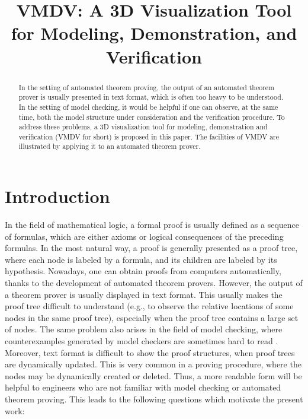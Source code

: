 \documentclass[runningheads]{llncs}
\newcommand\tool[1]{\textsf{#1}}
\newcommand\vmdv{\tool{VMDV}}
\newcommand\couic[1]{}
\begin{document}
	
\title{\vmdv: A 3D Visualization Tool for Modeling, Demonstration, and Verification}

\couic{\author{
       \IEEEauthorblockN{Jian Liu\IEEEauthorrefmark{1}\IEEEauthorrefmark{2},
       Ying Jiang\IEEEauthorrefmark{1} and
       Yanyun Chen\IEEEauthorrefmark{1}}
}}

\author{}


\maketitle

\begin{abstract}
In the setting of automated theorem proving,
the output of an automated theorem prover is usually presented in text format,
which is often too heavy to be understood. 
In the setting of model checking, 
it would be helpful if one can observe, at the same time, 
both the model structure under consideration and the verification procedure. 
To address these problems, 
a 3D visualization tool for modeling, demonstration and verification (\vmdv{} for short) is proposed in this paper. 
The facilities of \vmdv{} are illustrated by applying it to an automated theorem prover.


\end{abstract}

\section{Introduction}
In the field of mathematical logic, a formal proof is usually defined as a sequence of formulas,
which are either axioms or logical consequences of the preceding formulas. 
In the most natural way, a proof is generally presented as a proof tree, where
each node is labeled by a formula, and its children are labeled by its hypothesis. 
Nowadays, one can obtain proofs from computers automatically,
thanks to the development of automated theorem provers. 
However, the output of a theorem prover is usually displayed in text format. 
This usually makes the proof tree difficult to understand 
(e.g., to observe the relative locations of some nodes in the same proof tree), 
especially when the proof tree contains a large set of nodes. 
The same problem also arises in the field of model checking, 
where counterexamples generated by model checkers are sometimes hard to read \cite{CBJPK,CGP01,CGMZ}. 
Moreover, text format is difficult to show the proof structures, when proof trees are dynamically updated. 
This is very common in a proving procedure, where the nodes may be dynamically created or deleted.
Thus, 
a more readable form will be helpful to engineers who are not familiar with model checking or automated theorem proving. 
This leads to the following questions which motivate the present work: 
\end{document}
